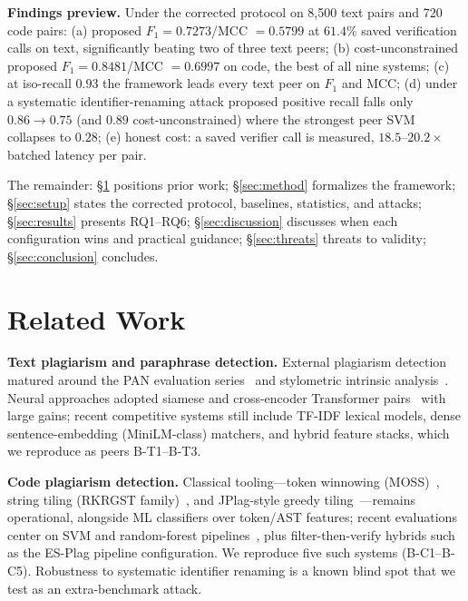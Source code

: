 \documentclass[conference]{IEEEtran}
\newcommand{\fone}{F_{1}}
\begin{document}
\noindent\textbf{Findings preview.} Under the corrected protocol on 8{,}500 text pairs and 720
code pairs: (a) proposed $\fone=0.7273$/MCC $=0.5799$ at $61.4\%$ saved verification calls on text,
significantly beating two of three text peers; (b) cost-unconstrained proposed $\fone=0.8481$/MCC
$=0.6997$ on code, the best of all nine systems; (c) at iso-recall $0.93$ the framework leads every
text peer on $\fone$ and MCC; (d) under a systematic identifier-renaming attack proposed positive
recall falls only $0.86\rightarrow0.75$ (and $0.89$ cost-unconstrained) where the strongest
peer SVM collapses to $0.28$; (e) honest cost: a saved verifier call is measured,
$18.5$--$20.2\times$ batched latency per pair.

The remainder: \S\ref{sec:related} positions prior work; \S\ref{sec:method} formalizes the
framework; \S\ref{sec:setup} states the corrected protocol, baselines, statistics, and attacks;
\S\ref{sec:results} presents RQ1--RQ6; \S\ref{sec:discussion} discusses when each configuration wins
and practical guidance; \S\ref{sec:threats} threats to validity; \S\ref{sec:conclusion} concludes.

\section{Related Work}
\label{sec:related}

\textbf{Text plagiarism and paraphrase detection.} External plagiarism detection matured around the
PAN evaluation series~\cite{potthast2010} and stylometric intrinsic analysis~\cite{stamatatos2011}.
Neural approaches adopted siamese and cross-encoder Transformer pairs~\cite{devlin2018,humeau2019,reimers2019}
with large gains; recent competitive systems still include TF-IDF lexical models, dense
sentence-embedding (MiniLM-class) matchers, and hybrid feature stacks, which we reproduce as
peers B-T1--B-T3.

\textbf{Code plagiarism detection.} Classical tooling---token winnowing (MOSS)~\cite{schleimer2003},
string tiling (RKRGST family)~\cite{wise1996}, and JPlag-style greedy tiling~\cite{prechelt2002}---remains
operational, alongside ML classifiers over token/AST features; recent evaluations center on SVM and
random-forest pipelines~\cite{gandhi2024,mehsen2024}, plus filter-then-verify hybrids such as the
ES-Plag pipeline configuration. We reproduce five such systems (B-C1--B-C5). Robustness to systematic
identifier renaming is a known blind spot that we test as an extra-benchmark attack.
\end{document}
